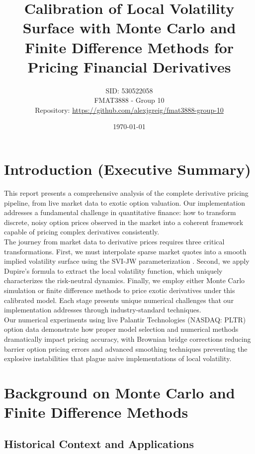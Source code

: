 \documentclass[11pt,a4paper]{article}
\title{\textbf{Calibration of Local Volatility Surface with Monte Carlo and Finite Difference Methods for Pricing Financial Derivatives}}
\author{SID: 530522058 \\ FMAT3888 - Group 10 \\ Repository: \url{https://github.com/alexjgreig/fmat3888-group-10}}
\date{\today}
\begin{document}
\maketitle
\thispagestyle{empty}
\newpage

\tableofcontents
\newpage

\section{Introduction (Executive Summary)}

This report presents a comprehensive analysis of the complete derivative pricing pipeline, from live market data to exotic option valuation. Our implementation addresses a fundamental challenge in quantitative finance: how to transform discrete, noisy option prices observed in the market into a coherent framework capable of pricing complex derivatives consistently. \\

The journey from market data to derivative prices requires three critical transformations. First, we must interpolate sparse market quotes into a smooth implied volatility surface using the SVI-JW parameterization \cite{Gatheral2014}. Second, we apply Dupire's formula \cite{Dupire1994} to extract the local volatility function, which uniquely characterizes the risk-neutral dynamics. Finally, we employ either Monte Carlo simulation or finite difference methods to price exotic derivatives under this calibrated model. Each stage presents unique numerical challenges that our implementation addresses through industry-standard techniques. \\

Our numerical experiments using live Palantir Technologies (NASDAQ: PLTR) option data demonstrate how proper model selection and numerical methods dramatically impact pricing accuracy, with Brownian bridge corrections \cite{Broadie1997} reducing barrier option pricing errors and advanced smoothing techniques preventing the explosive instabilities that plague naive implementations of local volatility. \\

\section{Background on Monte Carlo and Finite Difference Methods}

\subsection{Historical Context and Applications}
\end{document}
